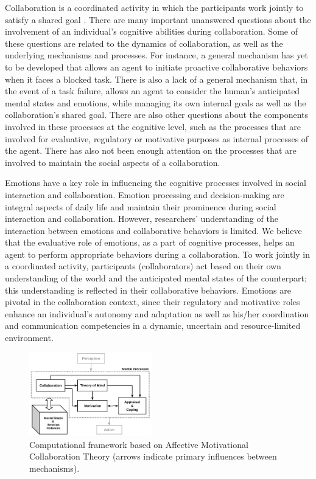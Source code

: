 \documentclass[letterpaper]{article}
\begin{document}
Collaboration is a coordinated activity in which the participants work jointly
to satisfy a shared goal \cite{grosz:plans-discourse}. There are many important
unanswered questions about the involvement of an individual's cognitive
abilities during collaboration. Some of these questions are related to the
dynamics of collaboration, as well as the underlying mechanisms and processes.
For instance, a general mechanism has yet to be developed that allows an agent
to initiate proactive collaborative behaviors when it faces a blocked task.
There is also a lack of a general mechanism that, in the event of a task
failure, allows an agent to consider the human's anticipated mental states and
emotions, while managing its own internal goals as well as the collaboration's
shared goal. There are also other questions about the components involved in
these processes at the cognitive level, such as the processes that are involved
for evaluative, regulatory or motivative purposes as internal processes of the
agent. There has also not been enough attention on the processes that are
involved to maintain the social aspects of a collaboration.

Emotions have a key role in influencing the cognitive processes involved in
social interaction and collaboration. Emotion processing and decision-making are
integral aspects of daily life and maintain their prominence during social
interaction and collaboration. However, researchers' understanding of the
interaction between emotions and collaborative behaviors is limited. We believe
that the evaluative role of emotions, as a part of cognitive processes, helps an
agent to perform appropriate behaviors during a collaboration. To work jointly
in a coordinated activity, participants (collaborators) act based on their own
understanding of the world and the anticipated mental states of the counterpart;
this understanding is reflected in their collaborative behaviors. Emotions are
pivotal in the collaboration context, since their regulatory and motivative
roles enhance an individual's autonomy and adaptation as well as his/her
coordination and communication competencies in a dynamic, uncertain and
resource-limited environment.

\begin{figure}[tbh]
  \centering
  \includegraphics[width=0.474\textwidth]{figure/theory-general-croped.pdf}
  \caption{Computational framework based on Affective Motivational Collaboration
  Theory (arrows indicate primary influences between mechanisms).}
  \label{fig:cpm}
\end{figure}
\end{document}
